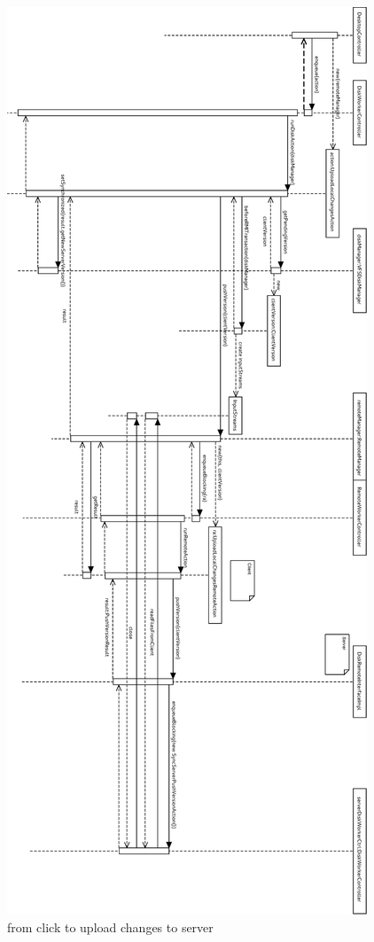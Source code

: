 \begin{figure}[h!]
\centering
\includegraphics[height=\textheight,width=\textwidth,keepaspectratio]{figures/22uploadChanges.eps}
\caption{from click to upload changes to server}
\label{fig:22uploadChanges}
\end{figure}

